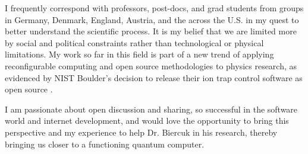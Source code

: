 \documentclass{article}
\begin{document}
I
frequently correspond with professors, post-docs, and grad students from groups
in Germany, Denmark, England, Austria, and the across the U.S. in my quest to
better understand the scientific process. It is my belief that we are limited
more by social and political constraints rather than technological or physical
limitations. My work so far in this field is part of a
new trend of applying reconfigurable computing and open source
methodologies to physics research, as evidenced by NIST Boulder's decision
to release their ion trap control software as open source \cite{ionizer2010}.

I am passionate about open discussion and sharing, so successful in
the software world and internet development, and would love the opportunity to
bring this perspective and my experience to help Dr. Biercuk in his research,
thereby bringing us closer to a functioning quantum computer.



\end{document}
